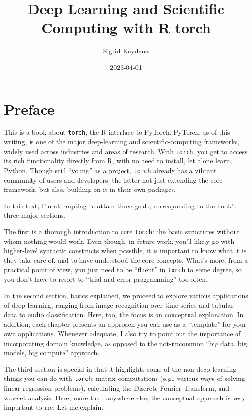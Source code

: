 \documentclass[
  letterpaper,
]{krantz}
\title{Deep Learning and Scientific Computing with R torch}
\author{Sigrid Keydana}
\date{2023-04-01}
\renewcommand*\contentsname{Table of contents}
\newcommand\contentsname{Table of contents}
\begin{document}
\maketitle
\renewcommand*\contentsname{Contents}
{
\setcounter{tocdepth}{2}
\tableofcontents
}
\listoffigures
{}

\hypertarget{preface}{%
\chapter*{Preface}\label{preface}}


This is a book about \texttt{torch}, the R interface to PyTorch.
PyTorch, as of this writing, is one of the major deep-learning and
scientific-computing frameworks, widely used across industries and areas
of research. With \texttt{torch}, you get to access its rich
functionality directly from R, with no need to install, let alone learn,
Python. Though still ``young'' as a project, \texttt{torch} already has
a vibrant community of users and developers; the latter not just
extending the core framework, but also, building on it in their own
packages.

In this text, I'm attempting to attain three goals, corresponding to the
book's three major sections.

The first is a thorough introduction to core \texttt{torch}: the basic
structures without whom nothing would work. Even though, in future work,
you'll likely go with higher-level syntactic constructs when possible,
it is important to know what it is they take care of, and to have
understood the core concepts. What's more, from a practical point of
view, you just need to be ``fluent'' in \texttt{torch} to some degree,
so you don't have to resort to ``trial-and-error-programming'' too
often.

In the second section, basics explained, we proceed to explore various
applications of deep learning, ranging from image recognition over time
series and tabular data to audio classification. Here, too, the focus is
on conceptual explanation. In addition, each chapter presents an
approach you can use as a ``template'' for your own applications.
Whenever adequate, I also try to point out the importance of
incorporating domain knowledge, as opposed to the not-uncommon ``big
data, big models, big compute'' approach.

The third section is special in that it highlights some of the
non-deep-learning things you can do with \texttt{torch}: matrix
computations (e.g., various ways of solving linear-regression problems),
calculating the Discrete Fourier Transform, and wavelet analysis. Here,
more than anywhere else, the conceptual approach is very important to
me. Let me explain.
\end{document}
